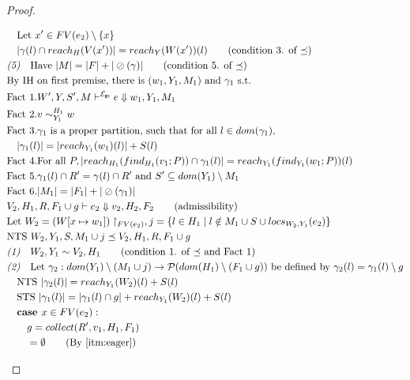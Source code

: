 \documentclass{easychair}
\newcommand{\ms}[1]{\ensuremath{\mathsf{#1}}}
\newcommand{\veq}[4]{#3 \sim^{#1}_{#2} #4}
\newcommand{\oh}[1]{\oslash(#1)}
\newcommand{\gcSem}{\ensuremath{\mathcal{E}_{\ms{gc}}}}
\theoremstyle{definition}
\begin{document}
\begin{proof}
\begin{description}
\begin{align*}
		&\quad \text{Let } x' \in FV(e_2) \setminus \{x\}\\
		&\quad |\gamma(l) \cap reach_H(V(x'))| = reach_Y(W(x'))(l) \tag{condition 3. of $\preceq$}\\
		&\emph{(5)}\quad \text{Have } |M| = |F| + |\oh{\gamma}| \tag{condition 5. of $\preceq$}\\
		&\text{By IH on first premise, there is } (w_1,Y_1,M_1) \text{ and } \gamma_1 \text{ s.t. }\\
		&\text{Fact 1}. W',Y,S',M \vdash^{\gcSem} e \Downarrow w_1,Y_1,M_1\\
		&\text{Fact 2}. \veq{H_1}{Y_1}{v}{w}\\
		&\text{Fact 3}. \gamma_1 \text{ is a proper partition, such that for all } l \in dom(\gamma_1),\\
		&\quad|\gamma_1(l)| = |reach_{Y_1}(w_1)(l)| + S(l)\\
		&\text{Fact 4}. \text{For all } P, |reach_{H_1}(find_{H_1}(v_1;P)) \cap \gamma_1(l)| = 
				reach_{Y_1}(find_{Y_1}(w_1;P))(l)\\
		&\text{Fact 5}. \gamma_1(l) \cap R' = \gamma(l) \cap R' \text{ and } 
			S' \subseteq dom(Y_1) \setminus M_1\\
		&\text{Fact 6}. |M_1| = |F_1| + |\oh{\gamma_1}|\\
		&V_2,H_1,R, F_1 \cup g \vdash e_2 \Downarrow v_2,H_2,F_2 \tag{admissibility}\\
		&\text{Let } W_2 = (W[x \mapsto w_1])\restriction_{FV(e_2)}, 
			j = \{ l \in H_1 \mid l \notin M_1 \cup S \cup locs_{W_2,Y_1}(e_2) \}\\
		&\text{NTS } W_2,Y_1,S,M_1 \cup j \preceq V_2,H_1,R, F_1 \cup g\\
		&\emph{(1)}\quad W_2,Y_1 \sim V_2,H_1 \tag{condition 1. of $\preceq$ and Fact 1}\\
		&\emph{(2)}\quad \text{Let } \gamma_2 : dom(Y_1) \setminus (M_1 \cup j) 
			\to \mathcal{P}(dom(H_1)\setminus (F_1 \cup g)) \text{ be defined by } 
			\gamma_2(l) = \gamma_1(l) \setminus g\\
		&\quad \text{NTS } |\gamma_2(l)| = reach_{Y_1}(W_2)(l) + S(l)\\
		&\quad \text{STS } |\gamma_1(l)| = |\gamma_1(l) \cap g| + reach_{Y_1}(W_2)(l) + S(l)\\
		&\quad \textbf{case } x \in FV(e_2):\\
		&\quad\quad g =  collect(R',v_1,H_1,F_1) \\
		&\quad\quad = \emptyset  \tag{By \ref{itm:eager}}\\

\end{align*}
\end{description}
\end{proof}
\end{document}
